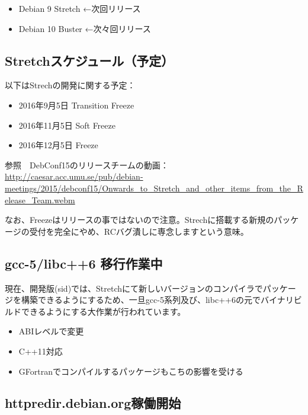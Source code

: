 \documentclass[mingoth,a4paper]{jsarticle}
\begin{document}
  \begin{itemize}
  \item Debian 9 Stretch ←次回リリース
  \item Debian 10 Buster ←次々回リリース
  \end{itemize}
  

\subsection{Stretchスケジュール（予定）}

以下はStrechの開発に関する予定：

\begin{itemize}
  \item 2016年9月5日 Transition Freeze
  \item 2016年11月5日 Soft Freeze
  \item 2016年12月5日 Freeze
\end{itemize}

参照　DebConf15のリリースチームの動画：
\url{http://caesar.acc.umu.se/pub/debian-meetings/2015/debconf15/Onwards_to_Stretch_and_other_items_from_the_Release_Team.webm}

 なお、Freezeはリリースの事ではないので注意。Strechに搭載する新規のパッケージの受付を完全にやめ、RCバグ潰しに専念しますという意味。
  

\subsection{gcc-5/libc++6 移行作業中}

 現在、開発版(sid)では、Stretchにて新しいバージョンのコンパイラでパッケージを構築できるようにするため、一旦gcc-5系列及び、libc++6の元でバイナリビルドできるようにする大作業が行われています。

\begin{itemize} 
\item ABIレベルで変更
\item C++11対応
\item GFortranでコンパイルするパッケージもこちの影響を受ける
\end{itemize}


\subsection{httpredir.debian.org稼働開始}
\end{document}
